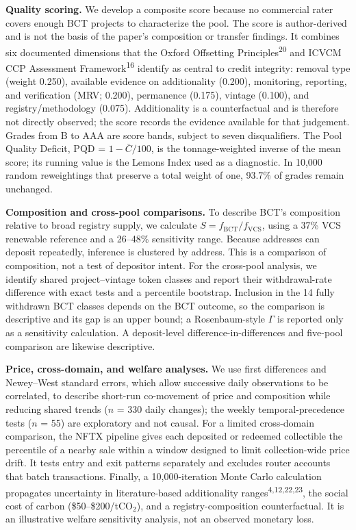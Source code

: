 \documentclass[sn-nature,Numbered]{sn-jnl}
\begin{document}
\textbf{Quality scoring.} We develop a composite score because no commercial rater covers enough BCT projects to characterize the pool. The score is author-derived and is not the basis of the paper's composition or transfer findings. It combines six documented dimensions that the Oxford Offsetting Principles\textsuperscript{20} and ICVCM CCP Assessment Framework\textsuperscript{16} identify as central to credit integrity: removal type (weight 0.250), available evidence on additionality (0.200), monitoring, reporting, and verification (MRV; 0.200), permanence (0.175), vintage (0.100), and registry/methodology (0.075). Additionality is a counterfactual and is therefore not directly observed; the score records the evidence available for that judgement. Grades from B to AAA are score bands, subject to seven disqualifiers. The Pool Quality Deficit, PQD = $1 - \bar{C}/100$, is the tonnage-weighted inverse of the mean score; its running value is the Lemons Index used as a diagnostic. In 10,000 random reweightings that preserve a total weight of one, 93.7\% of grades remain unchanged.

\textbf{Composition and cross-pool comparisons.} To describe BCT's composition relative to broad registry supply, we calculate $S = f_{\text{BCT}} / f_{\text{VCS}}$, using a 37\% VCS renewable reference and a 26--48\% sensitivity range. Because addresses can deposit repeatedly, inference is clustered by address. This is a comparison of composition, not a test of depositor intent. For the cross-pool analysis, we identify shared project--vintage token classes and report their withdrawal-rate difference with exact tests and a percentile bootstrap. Inclusion in the 14 fully withdrawn BCT classes depends on the BCT outcome, so the comparison is descriptive and its gap is an upper bound; a Rosenbaum-style $\Gamma$ is reported only as a sensitivity calculation. A deposit-level difference-in-differences and five-pool comparison are likewise descriptive.

\textbf{Price, cross-domain, and welfare analyses.} We use first differences and Newey--West standard errors, which allow successive daily observations to be correlated, to describe short-run co-movement of price and composition while reducing shared trends ($n$ = 330 daily changes); the weekly temporal-precedence tests ($n$ = 55) are exploratory and not causal. For a limited cross-domain comparison, the NFTX pipeline gives each deposited or redeemed collectible the percentile of a nearby sale within a window designed to limit collection-wide price drift. It tests entry and exit patterns separately and excludes router accounts that batch transactions. Finally, a 10,000-iteration Monte Carlo calculation propagates uncertainty in literature-based additionality ranges\textsuperscript{4,12,22,23}, the social cost of carbon (\$50--\$200/tCO$_2$), and a registry-composition counterfactual. It is an illustrative welfare sensitivity analysis, not an observed monetary loss.
\end{document}
